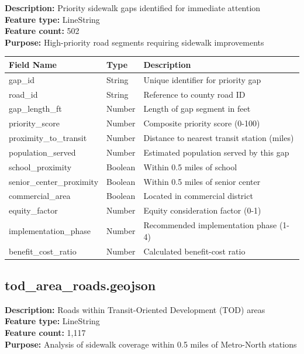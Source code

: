 \documentclass[11pt,letterpaper]{article}
\begin{document}
\textbf{Description:} Priority sidewalk gaps identified for immediate attention\\
\textbf{Feature type:} LineString\\
\textbf{Feature count:} 502\\
\textbf{Purpose:} High-priority road segments requiring sidewalk improvements

\begin{table}[h]
\centering
\caption{Attribute Dictionary - priority\_sidewalk\_gaps.geojson}
\begin{longtable}{lll}
\toprule
\textbf{Field Name} & \textbf{Type} & \textbf{Description} \\
\midrule
gap\_id & String & Unique identifier for priority gap \\
road\_id & String & Reference to county road ID \\
gap\_length\_ft & Number & Length of gap segment in feet \\
priority\_score & Number & Composite priority score (0-100) \\
proximity\_to\_transit & Number & Distance to nearest transit station (miles) \\
population\_served & Number & Estimated population served by this gap \\
school\_proximity & Boolean & Within 0.5 miles of school \\
senior\_center\_proximity & Boolean & Within 0.5 miles of senior center \\
commercial\_area & Boolean & Located in commercial district \\
equity\_factor & Number & Equity consideration factor (0-1) \\
implementation\_phase & Number & Recommended implementation phase (1-4) \\
benefit\_cost\_ratio & Number & Calculated benefit-cost ratio \\
\bottomrule
\end{longtable}
\end{table}

\subsection{tod\_area\_roads.geojson}

\textbf{Description:} Roads within Transit-Oriented Development (TOD) areas\\
\textbf{Feature type:} LineString\\
\textbf{Feature count:} 1,117\\
\textbf{Purpose:} Analysis of sidewalk coverage within 0.5 miles of Metro-North stations
\end{document}
